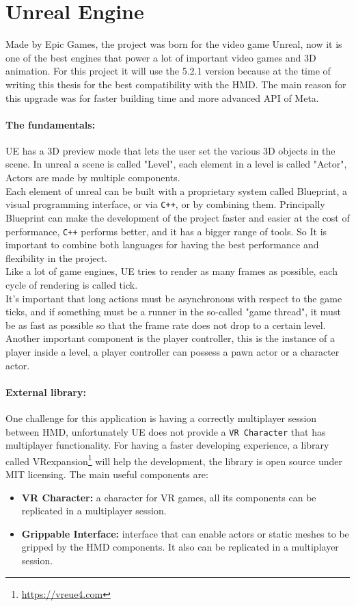\section{Unreal Engine}
\noindent
Made by Epic Games, the project was born for the video game Unreal,
now it is one of the best engines that power a lot of important video games and 3D animation. 
For this project it will use the 5.2.1 version because at the time of writing this thesis for the best compatibility with the \ac{HMD}. 
The main reason for this upgrade was for faster building time and more advanced \ac{API} of Meta. 

\paragraph{The fundamentals:}
\ac{UE} has a 3D preview mode that lets the user set the various 3D objects in the scene.
In unreal a scene is called "Level", each element in a level is called "Actor", Actors are made by multiple components.\\
Each element of unreal can be built with a proprietary system called Blueprint, a visual programming interface, or via \texttt{C++}, or by combining them.
Principally Blueprint can make the development of the project faster and easier at the cost of performance, \texttt{C++} performs better, and it has a bigger range of tools.
So It is important to combine both languages for having the best performance and flexibility in the project.\\
Like a lot of game engines, \ac{UE} tries to render as many frames as possible, each cycle of rendering is called tick.\\
It's important that long actions must be asynchronous with respect to the game ticks, and if something must be a runner in the so-called "game thread", it must be as fast as possible so that the frame rate does not drop to a certain level.\\
Another important component is the player controller, this is the instance of a player inside a level, a player controller can possess a pawn actor or a character actor.


\paragraph{External library:}
One challenge for this application is having a correctly multiplayer session between \ac{HMD}, unfortunately \ac{UE} does not provide a \texttt{VR Character} that has multiplayer functionality.
For having a faster developing experience, a library called VRexpansion\footnote{\url{https://vreue4.com}} will help the development, the library is open source under MIT licensing.
The main useful components are:
\begin{itemize}
  \item \textbf{VR Character:} a character for \ac{VR} games, all its components can be replicated in a multiplayer session.
  \item \textbf{Grippable Interface:}  interface that can enable actors or static meshes to be gripped by the \ac{HMD} components. It also can be replicated in a multiplayer session.
\end{itemize}

